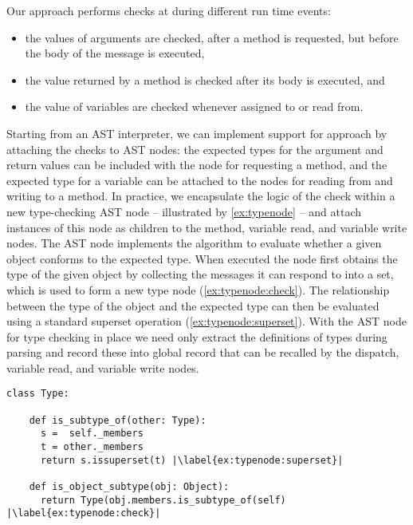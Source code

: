 

Our approach performs checks at during different run time events:

\begin{itemize}
\item the values of arguments are checked, after a method is requested, 
      but before the body of the message is executed,
\item the value returned by a method is checked after its body is executed, and
\item the value of variables are checked whenever assigned to or read from.
\end{itemize}

Starting from an AST interpreter,
we can implement support for approach by attaching the checks to AST nodes:
the expected types for the argument and return values can be included
with the node for requesting a method, and the expected type for a variable
can be attached to the nodes for reading from and writing to a method.
In practice,
we encapsulate the logic of the check within a new type-checking AST node
-- illustrated by \cref{ex:typenode} --
and attach instances of this node as children to the method,
variable read, and variable write nodes. 
The AST node implements the algorithm to evaluate whether a given object
conforms to the expected type.
When executed the node first obtains the type of the given object by
collecting the messages it can respond to into a set,
which is used to form a new type node (\cref{ex:typenode:check}).
The relationship between the type of the object and the expected type can
then be evaluated using a standard superset operation (\cref{ex:typenode:superset}).
With the AST node for type checking in place 
we need only extract the definitions of types during parsing 
and record these into global record that can be recalled by the
dispatch, variable read, and variable write nodes.


\begin{lstlisting}[label={ex:typenode},escapechar=|,caption={An illustration of the AST node that we use to perform type checks},float,floatplacement=htbp]
class Type:

    def is_subtype_of(other: Type):
      s =  self._members
      t = other._members
      return s.issuperset(t) |\label{ex:typenode:superset}|

    def is_object_subtype(obj: Object):
      return Type(obj.members.is_subtype_of(self) |\label{ex:typenode:check}|

\end{lstlisting}


